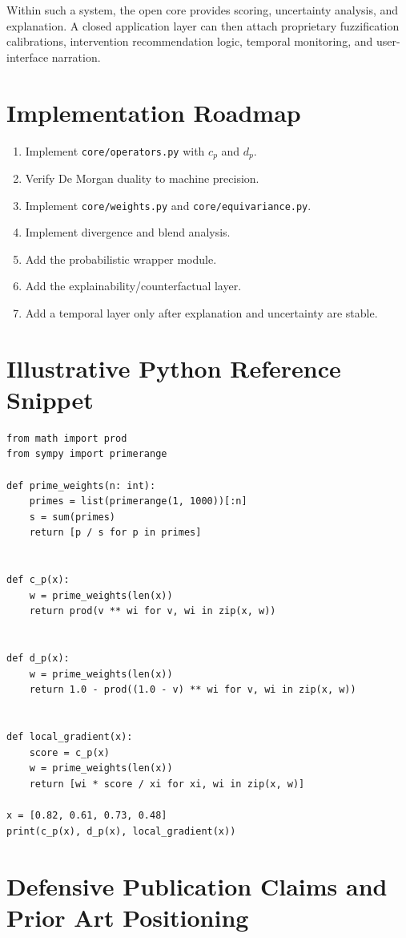 \documentclass[11pt]{article}
\begin{document}
Within such a system, the open core provides scoring, uncertainty analysis, and explanation. A closed application layer can then attach proprietary fuzzification calibrations, intervention recommendation logic, temporal monitoring, and user-interface narration.

\section{Implementation Roadmap}
\begin{enumerate}[label=\arabic*.]
  \item Implement \texttt{core/operators.py} with $c_p$ and $d_p$.
  \item Verify De Morgan duality to machine precision.
  \item Implement \texttt{core/weights.py} and \texttt{core/equivariance.py}.
  \item Implement divergence and blend analysis.
  \item Add the probabilistic wrapper module.
  \item Add the explainability/counterfactual layer.
  \item Add a temporal layer only after explanation and uncertainty are stable.
\end{enumerate}

\section{Illustrative Python Reference Snippet}
\begin{lstlisting}[style=pystyle]
from math import prod
from sympy import primerange

def prime_weights(n: int):
    primes = list(primerange(1, 1000))[:n]
    s = sum(primes)
    return [p / s for p in primes]


def c_p(x):
    w = prime_weights(len(x))
    return prod(v ** wi for v, wi in zip(x, w))


def d_p(x):
    w = prime_weights(len(x))
    return 1.0 - prod((1.0 - v) ** wi for v, wi in zip(x, w))


def local_gradient(x):
    score = c_p(x)
    w = prime_weights(len(x))
    return [wi * score / xi for xi, wi in zip(x, w)]

x = [0.82, 0.61, 0.73, 0.48]
print(c_p(x), d_p(x), local_gradient(x))
\end{lstlisting}

\section{Defensive Publication Claims and Prior Art Positioning}
\end{document}
